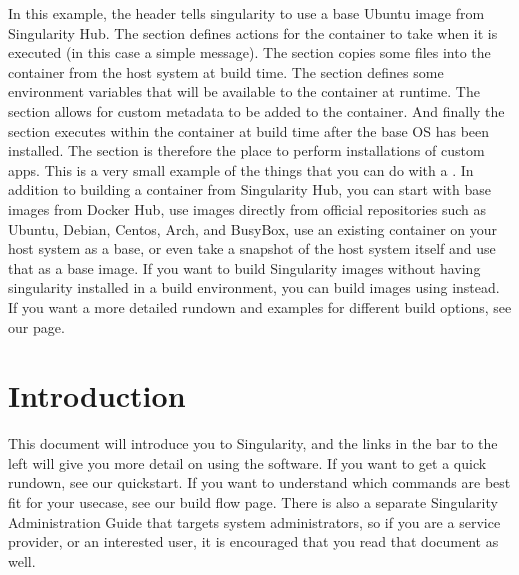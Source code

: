 \documentclass[letterpaper,10pt,english]{sphinxmanual}
\begin{document}
In this example, the header tells singularity to use a base Ubuntu
image from Singularity Hub. The  section defines actions for the
container to take when it is executed (in this case a simple message).
The  section copies some files into the container from the host system
at build time. The  section defines some environment variables that
will be available to the container at runtime. The  section allows for
custom metadata to be added to the container. And finally the  section
executes within the container at build time after the base OS has been
installed. The  section is therefore the place to perform installations
of custom apps.
This is a very small example of the things that you can do with a {\hyperref[\detokenize{container_recipes:container-recipes}]{}} . In
addition to building a container from Singularity Hub, you can start
with base images from Docker Hub, use images directly from official
repositories such as Ubuntu, Debian, Centos, Arch, and BusyBox, use an
existing container on your host system as a base, or even take a
snapshot of the host system itself and use that as a base image.
If you want to build Singularity images without having singularity
installed in a build environment, you can build images using
instead. If you want a more detailed rundown and examples for
different build options, see our {\hyperref[\detokenize{singularity_flow:singularity-flow}]{}} page.


\chapter{Introduction}
\label{\detokenize{introduction:introduction}}\label{\detokenize{introduction::doc}}
This document will introduce you to Singularity, and the links in the
bar to the left will give you more detail on using the software. If you
want to get a quick rundown, see our quickstart. If you want to
understand which commands are best fit for your usecase, see our build
flow page. There is also a separate Singularity Administration Guide
that targets system administrators, so if you are a service provider, or
an interested user, it is encouraged that you read that document as
well.
\end{document}

